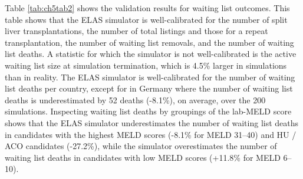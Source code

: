 \documentclass[11pt,twoside,]{book}
\begin{document}
Table \ref{tab:ch5tab2} shows the validation results for waiting list outcomes. This table shows that the ELAS simulator
is well-calibrated for the number of
split liver transplantations, the number of total listings and those for a repeat transplantation, the number of waiting list
removals, and the number of waiting list deaths. A statistic for which
the simulator is not well-calibrated is the active waiting list size at
simulation termination, which is 4.5\% larger in simulations than
in reality. The ELAS simulator is well-calibrated for the number of
waiting list
deaths per country, except for in Germany where the number of waiting
list deaths is underestimated by 52 deaths (-8.1\%), on average, over the 200
simulations.
Inspecting waiting list deaths by groupings of the lab-MELD score shows that the ELAS simulator
underestimates the number of waiting list deaths in candidates with the
highest MELD scores (-8.1\% for MELD 31--40) and HU / ACO candidates
(-27.2\%), while the simulator overestimates the number of waiting list
deaths in candidates with low MELD scores (+11.8\% for MELD 6--10).
\end{document}
